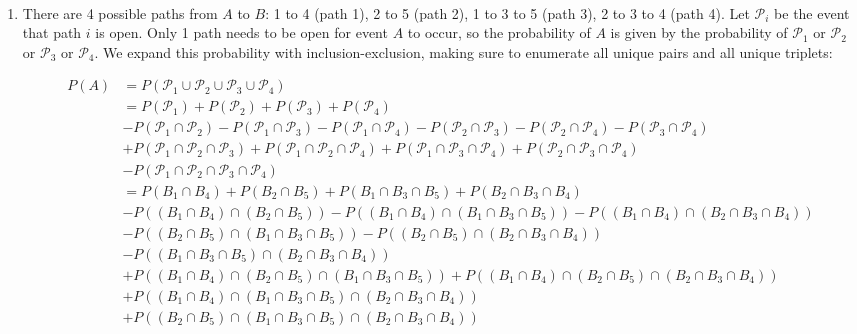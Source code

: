 \begin{problem}{32} $ $

\begin{enumerate}

\item
There are 4 possible paths from $A$ to $B$: 1 to 4 (path 1), 2 to 5 (path 2), 1 to 3 to 5 (path 3), 2 to 3 to 4 (path 4).  Let $\mathcal P_i$ be the event that path $i$ is open.  Only 1 path needs to be open for event $A$ to occur, so the probability of $A$ is given by the probability of $\mathcal P_1$ or $\mathcal P_2$ or $\mathcal P_3$ or $\mathcal P_4$.  We expand this probability with inclusion-exclusion, making sure to enumerate all unique pairs and all unique triplets:

\begin{align*}
P(A)& = P(\mathcal P_1 \cup \mathcal P_2 \cup \mathcal P_3 \cup \mathcal P_4) \\
&= P(\mathcal P_1)+ P(\mathcal P_2)+P(\mathcal P_3)+P( \mathcal P_4) \\
&- P(\mathcal P_1\cap \mathcal P_2)-P(\mathcal P_1\cap \mathcal P_3)-P(\mathcal P_1\cap \mathcal P_4)-P(\mathcal P_2\cap \mathcal P_3)-P(\mathcal P_2\cap \mathcal P_4)-P(\mathcal P_3\cap \mathcal P_4) \\
&+P(\mathcal P_1\cap \mathcal P_2 \cap \mathcal P_3)+P(\mathcal P_1\cap \mathcal P_2 \cap \mathcal P_4)+P(\mathcal P_1\cap \mathcal P_3 \cap \mathcal P_4)+P(\mathcal P_2\cap \mathcal P_3 \cap \mathcal P_4) \\
& - P(\mathcal P_1 \cap \mathcal P_2 \cap \mathcal P_3 \cap \mathcal P_4 ) \\
&= P(B_1\cap B_4)+ P(B_2\cap B_5)+P(B_1 \cap B_3 \cap B_5)+P(B_2 \cap B_3 \cap B_4) \\
&- P((B_1\cap B_4)\cap (B_2\cap B_5))-P((B_1\cap B_4)\cap (B_1 \cap B_3 \cap B_5))-P((B_1\cap B_4)\cap (B_2 \cap B_3 \cap B_4))\\
&-P((B_2\cap B_5)\cap (B_1 \cap B_3 \cap B_5))-P((B_2\cap B_5)\cap (B_2 \cap B_3 \cap B_4))\\
&-P((B_1 \cap B_3 \cap B_5)\cap (B_2 \cap B_3 \cap B_4)) \\
&+P((B_1\cap B_4)\cap (B_2\cap B_5) \cap (B_1 \cap B_3 \cap B_5))+P((B_1\cap B_4)\cap (B_2\cap B_5) \cap (B_2 \cap B_3 \cap B_4))\\
&+P((B_1\cap B_4)\cap (B_1 \cap B_3 \cap B_5) \cap (B_2 \cap B_3 \cap B_4))\\
&+P((B_2\cap B_5)\cap (B_1 \cap B_3 \cap B_5) \cap (B_2 \cap B_3 \cap B_4)) \\

\end{align*}
\end{enumerate}
\end{problem}
